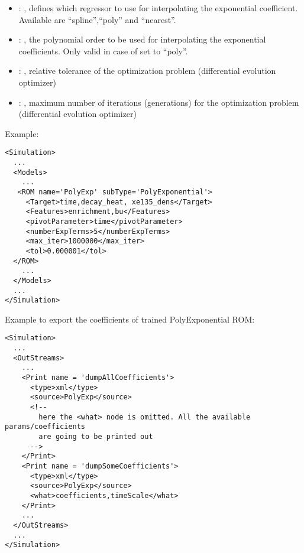 \begin{itemize}
    \item {}: ,
      defines which regressor to use for interpolating the
      exponential coefficient. Available are ``spline'',``poly'' and ``nearest''.

    \item {}: ,
      the polynomial order to be used for interpolating the exponential
      coefficients. Only valid in case of   set to ``poly''.

    \item {}: ,
      relative tolerance of the optimization problem (differential evolution optimizer)

    \item {}: ,
      maximum number of iterations (generations) for the
      optimization problem  (differential evolution optimizer)
  \end{itemize}

\hspace{24pt}
Example:
\begin{lstlisting}[style=XML,morekeywords={name,subType}]
<Simulation>
  ...
  <Models>
    ...
   <ROM name='PolyExp' subType='PolyExponential'>
     <Target>time,decay_heat, xe135_dens</Target>
     <Features>enrichment,bu</Features>
     <pivotParameter>time</pivotParameter>
     <numberExpTerms>5</numberExpTerms>
     <max_iter>1000000</max_iter>
     <tol>0.000001</tol>
  </ROM>
    ...
  </Models>
  ...
</Simulation>
\end{lstlisting}

Example to export the coefficients of trained PolyExponential ROM:
\begin{lstlisting}[style=XML,morekeywords={name,subType}]
<Simulation>
  ...
  <OutStreams>
    ...
    <Print name = 'dumpAllCoefficients'>
      <type>xml</type>
      <source>PolyExp</source>
      <!--
        here the <what> node is omitted. All the available params/coefficients
        are going to be printed out
      -->
    </Print>
    <Print name = 'dumpSomeCoefficients'>
      <type>xml</type>
      <source>PolyExp</source>
      <what>coefficients,timeScale</what>
    </Print>
    ...
  </OutStreams>
  ...
</Simulation>
\end{lstlisting}


